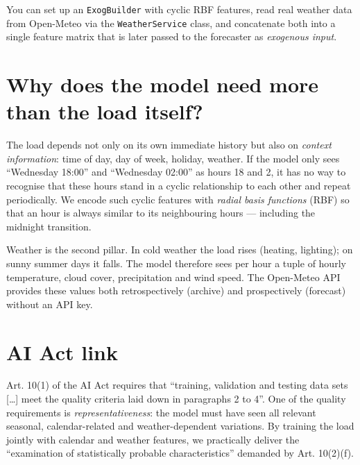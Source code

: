 \documentclass[
  english,
  letterpaper,
]{scrbook}
\begin{document}
\begin{tcolorbox}[enhanced jigsaw, arc=.35mm, bottomrule=.15mm, bottomtitle=1mm, breakable, colback=white, colbacktitle=quarto-callout-note-color!10!white, colframe=quarto-callout-note-color-frame, coltitle=black, left=2mm, leftrule=.75mm, opacityback=0, opacitybacktitle=0.6, rightrule=.15mm, title=\textcolor{quarto-callout-note-color}{\faInfo}\hspace{0.5em}{Learning objective}, titlerule=0mm, toprule=.15mm, toptitle=1mm]

You can set up an \texttt{ExogBuilder} with cyclic RBF features, read
real weather data from Open-Meteo via the \texttt{WeatherService} class,
and concatenate both into a single feature matrix that is later passed
to the forecaster as \emph{exogenous input}.

\end{tcolorbox}

\section{Why does the model need more than the load
itself?}\label{why-does-the-model-need-more-than-the-load-itself}

The load depends not only on its own immediate history but also on
\emph{context information}: time of day, day of week, holiday, weather.
If the model only sees ``Wednesday 18:00'' and ``Wednesday 02:00'' as
hours 18 and 2, it has no way to recognise that these hours stand in a
cyclic relationship to each other and repeat periodically. We encode
such cyclic features with \emph{radial basis functions} (RBF) so that an
hour is always similar to its neighbouring hours --- including the
midnight transition.

Weather is the second pillar. In cold weather the load rises (heating,
lighting); on sunny summer days it falls. The model therefore sees per
hour a tuple of hourly temperature, cloud cover, precipitation and wind
speed. The Open-Meteo API provides these values both retrospectively
(archive) and prospectively (forecast) without an API key.

\section{AI Act link}\label{ai-act-link-2}

Art. 10(1) of the AI Act requires that ``training, validation and
testing data sets {[}\ldots{]} meet the quality criteria laid down in
paragraphs 2 to 4''. One of the quality requirements is
\emph{representativeness}: the model must have seen all relevant
seasonal, calendar-related and weather-dependent variations. By training
the load jointly with calendar and weather features, we practically
deliver the ``examination of statistically probable characteristics''
demanded by Art. 10(2)(f).
\end{document}
